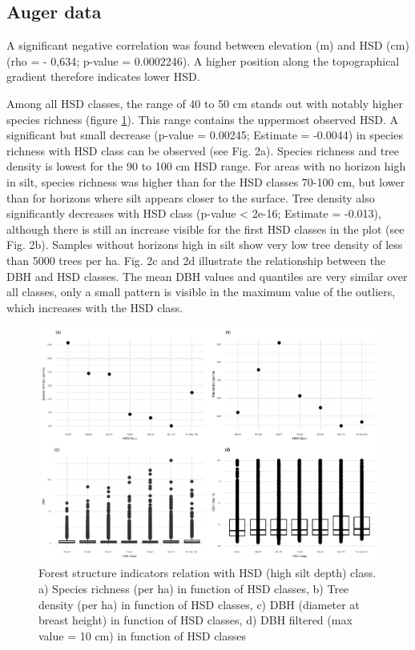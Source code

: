 \documentclass[fleqn,12pt]{latex/stylish_article} %
\begin{document}
\hypertarget{auger-data}{%
\subsection{Auger data}\label{auger-data}}

A significant negative correlation was found between elevation (m) and HSD (cm) (rho = - 0,634; p-value = 0.0002246). A higher position along the topographical gradient therefore indicates lower HSD.

Among all HSD classes, the range of 40 to 50 cm stands out with notably higher species richness (figure \ref{fig:auger}). This range contains the uppermost observed HSD. A significant but small decrease (p-value = 0.00245; Estimate = -0.0044) in species richness with HSD class can be observed (see Fig. 2a). Species richness and tree density is lowest for the 90 to 100 cm HSD range. For areas with no horizon high in silt, species richness was higher than for the HSD classes 70-100 cm, but lower than for horizons where silt appears closer to the surface. Tree density also significantly decreases with HSD class (p-value \textless{} 2e-16; Estimate = -0.013), although there is still an increase visible for the first HSD classes in the plot (see Fig. 2b). Samples without horizons high in silt show very low tree density of less than 5000 trees per ha.
Fig. 2c and 2d illustrate the relationship between the DBH and HSD classes. The mean DBH values and quantiles are very similar over all classes, only a small pattern is visible in the maximum value of the outliers, which increases with the HSD class.



\scriptsize

\begin{figure}

{\centering \includegraphics[width=0.8\linewidth,]{pedoP16-report_files/figure-latex/auger-1} 

}

\caption{Forest structure indicators relation with HSD (high silt depth) class. a) Species richness (per ha) in function of HSD classes, b) Tree density (per ha) in function of HSD classes, c) DBH (diameter at breast height) in function of HSD classes, d) DBH filtered (max value = 10 cm) in function of HSD classes}\label{fig:auger}
\end{figure}
\end{document}
